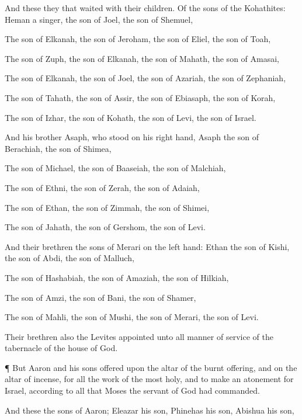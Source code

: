 {And these
{} they that
waited with their
children. Of the
sons of the
Kohathites:
Heman a
singer, the
son of
Joel, the
son of
Shemuel,

The
son of
Elkanah, the
son of
Jeroham, the
son of
Eliel, the
son of
Toah,

The
son of
Zuph, the
son of
Elkanah, the
son of
Mahath, the
son of
Amasai,

The
son of
Elkanah, the
son of
Joel, the
son of
Azariah, the
son of
Zephaniah,

The
son of
Tahath, the
son of
Assir, the
son of
Ebiasaph, the
son of
Korah,

The
son of
Izhar, the
son of
Kohath, the
son of
Levi, the
son of
Israel.

And his
brother
Asaph, who
stood on his right
hand,
{}
Asaph the
son of
Berachiah, the
son of
Shimea,

The
son of
Michael, the
son of
Baaseiah, the
son of
Malchiah,

The
son of
Ethni, the
son of
Zerah, the
son of
Adaiah,

The
son of
Ethan, the
son of
Zimmah, the
son of
Shimei,

The
son of
Jahath, the
son of
Gershom, the
son of
Levi.

And their
brethren the
sons of
Merari
{} on the left
hand:
Ethan the
son of
Kishi, the
son of
Abdi, the
son of
Malluch,

The
son of
Hashabiah, the
son of
Amaziah, the
son of
Hilkiah,

The
son of
Amzi, the
son of
Bani, the
son of
Shamer,

The
son of
Mahli, the
son of
Mushi, the
son of
Merari, the
son of
Levi.

Their
brethren also the
Levites
{}
appointed unto all manner of
service of the
tabernacle of the
house of
God.


\par }{\PP {}¶ But
Aaron and his
sons
offered upon the
altar of the burnt
offering, and on the
altar of
incense,
{} for all the
work of the
{}
most
holy, and to make an
atonement for
Israel, according to all that
Moses the
servant of
God had
commanded.

And these
{} the
sons of
Aaron;
Eleazar his
son,
Phinehas his
son,
Abishua his
son,

}
